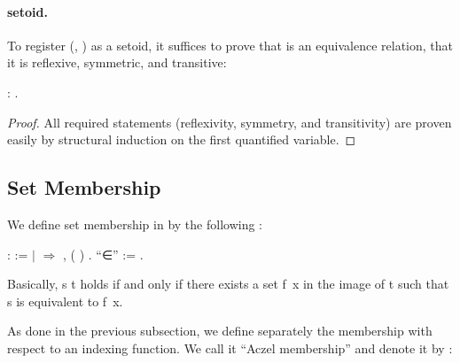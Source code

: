 \paragraph{\ZF{} setoid.} To register (, ) as a \Coq{} setoid, it suffices to prove that  is an equivalence relation, \ie{} that it is reflexive, symmetric, and transitive:

\begin{coqdoccode}
  \coqdocemptyline
  \coqdocnoindent
    :  .
\end{coqdoccode}
\begin{proof}
  All required statements (reflexivity, symmetry, and transitivity) are proven easily by structural induction on the first quantified variable.
\end{proof} 

\subsection{Set Membership}

We define set membership in \ZF{} by the following :

\begin{coqdoccode}
  \coqdocnoindent
{}    :  :=
  \coqdoceol
\coqdocindent{1.00em}
\ensuremath{|}    \ensuremath{\Rightarrow} \coqdoctac{\ensuremath{\exists}} ,   ( )\coqdoceol
\coqdocindent{0.00em}.\coqdoceol
\coqdocnoindent
{} ``∈'' := .\coqdoceol
\coqdocemptyline
\end{coqdoccode}

Basically, \var s \IN \var t holds if and only if there exists a set \var f~\var x in the image of \var t such that \var s is equivalent to \var f~\var x.

\medskip

As done in the previous subsection, we define separately the membership with respect to an indexing function. We call it ``Aczel membership'' and denote it by \AIN:

